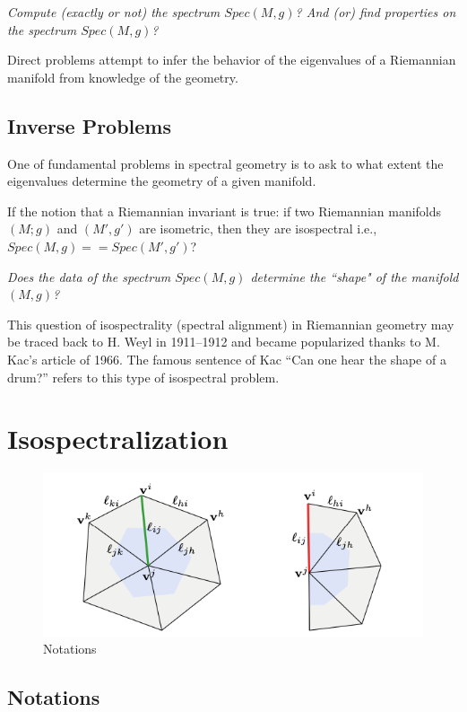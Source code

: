 \documentclass[a4paper,10pt]{article}
\begin{document}
\textit{Compute (exactly or not) the spectrum $ Spec(M, g) $? And (or) find properties on the spectrum $ Spec(M,g) $?}

Direct problems attempt to infer the behavior of the eigenvalues of a Riemannian manifold from knowledge of the geometry.

\subsection{Inverse Problems}

One of fundamental problems in spectral geometry is to ask to what extent the eigenvalues determine the geometry of a given manifold.

If the notion that a Riemannian invariant is true: if two Riemannian manifolds $  (M; g) $ and $ (M', g') $ are isometric, then they are isospectral i.e., $ Spec(M, g) == Spec(M', g') $?

\textit{Does the data of the spectrum $ Spec(M, g) $ determine the ``shape" of the manifold $ (M, g) $?}

This question of isospectrality (spectral alignment) in Riemannian geometry may be traced back to H. Weyl in 1911–1912 and became popularized thanks to M. Kac’s article of 1966. The famous sentence of Kac “Can one hear the shape of a drum?” refers to this type of isospectral problem.

\section{Isospectralization}

\begin{figure}[hbt!]
 \includegraphics[width=\textwidth]{notations}
 \caption{\label{fig:notations}Notations}
\end{figure}

\subsection{Notations}
\end{document}
